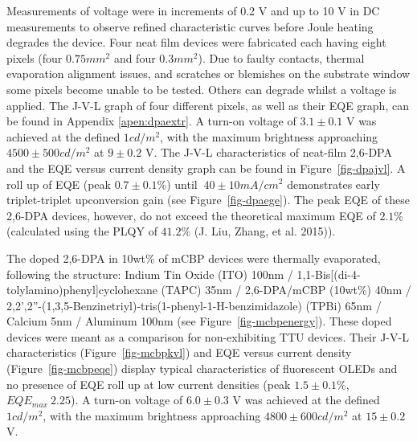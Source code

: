 \documentclass[
  letterpaper,
  DIV=11,
  numbers=noendperiod,
  oneside]{scrreprt}
\begin{document}
Measurements of voltage were in increments of 0.2 V and up to 10 V in DC
measurements to observe refined characteristic curves before Joule
heating degrades the device. Four neat film devices were fabricated each
having eight pixels (four \(0.75mm^2\) and four \(0.3mm^2\)). Due to
faulty contacts, thermal evaporation alignment issues, and scratches or
blemishes on the substrate window some pixels become unable to be
tested. Others can degrade whilst a voltage is applied. The J-V-L graph
of four different pixels, as well as their EQE graph, can be found in
Appendix \protect\hyperlink{apen:dpaextr}{{[}apen:dpaextr{]}}. A turn-on
voltage of \(3.1\pm0.1\) V was achieved at the defined \(1 cd/m^2\),
with the maximum brightness approaching \(4500\pm500 cd/m^2\) at
\(9\pm0.2\) V. The J-V-L characteristics of neat-film 2,6-DPA and the
EQE versus current density graph can be found in
Figure~\ref{fig-dpajvl}. A roll up of EQE (peak \(0.7\pm0.1\)\%) until
\(~40\pm10 mA/cm^2\) demonstrates early triplet-triplet upconversion
gain (see Figure~\ref{fig-dpaege}). The peak EQE of these 2,6-DPA
devices, however, do not exceed the theoretical maximum EQE of \(2.1\%\)
(calculated using the PLQY of \(41.2\%\) (J. Liu, Zhang, et al. 2015)).

The doped 2,6-DPA in 10wt\% of mCBP devices were thermally evaporated,
following the structure: Indium Tin Oxide (ITO) 100nm /
1,1-Bis{[}(di-4-tolylamino)phenyl{]}cyclohexane (TAPC) 35nm /
2,6-DPA/mCBP (10wt\%) 40nm /
2,2',2''-(1,3,5-Benzinetriyl)-tris(1-phenyl-1-H-benzimidazole) (TPBi)
65nm / Calcium 5nm / Aluminum 100nm (see Figure~\ref{fig-mcbpenergy}).
These doped devices were meant as a comparison for non-exhibiting TTU
devices. Their J-V-L characteristics (Figure~\ref{fig-mcbpkvl}) and EQE
versus current density (Figure~\ref{fig-mcbpeqe}) display typical
characteristics of fluorescent OLEDs and no presence of EQE roll up at
low current densities (peak \(1.5\pm0.1\%\),\(EQE_{max}~2.25\)). A
turn-on voltage of \(6.0\pm0.3\) V was achieved at the defined
\(1 cd/m^2\), with the maximum brightness approaching
\(4800\pm600 cd/m^2\) at \(15\pm0.2\) V.
\end{document}
